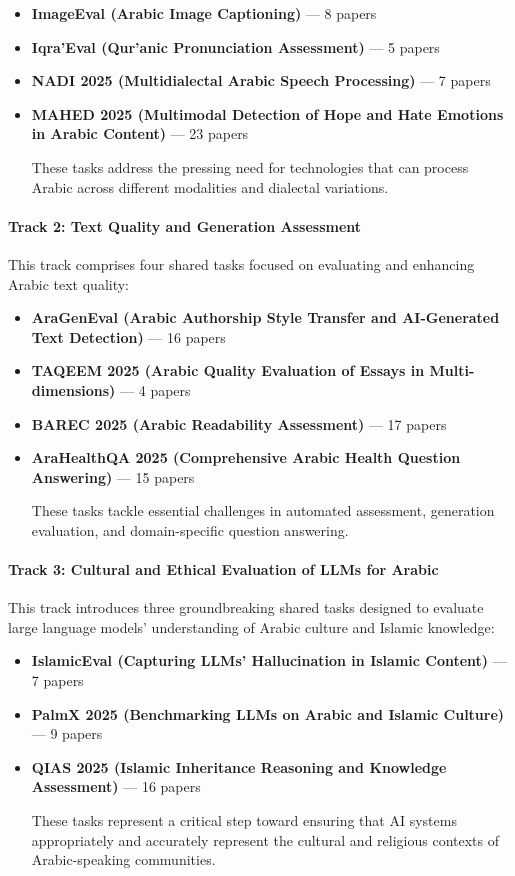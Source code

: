 \begin{itemize}
    \item \textbf{ImageEval (Arabic Image Captioning)} — 8 papers
    \item \textbf{Iqra’Eval (Qur’anic Pronunciation Assessment)} — 5 papers
    \item \textbf{NADI 2025 (Multidialectal Arabic Speech Processing)} — 7 papers
    \item \textbf{MAHED 2025 (Multimodal Detection of Hope and Hate Emotions in Arabic Content)} — 23 papers

 These tasks address the pressing need for technologies that can process Arabic across different modalities and dialectal variations.
\end{itemize}

\paragraph{\textbf{Track 2: Text Quality and Generation Assessment}}

This track comprises four shared tasks focused on evaluating and enhancing Arabic text quality:

\begin{itemize}
    \item \textbf{AraGenEval (Arabic Authorship Style Transfer and AI-Generated Text Detection)} — 16 papers
    \item \textbf{TAQEEM 2025 (Arabic Quality Evaluation of Essays in Multi-dimensions)} — 4 papers
    \item \textbf{BAREC 2025 (Arabic Readability Assessment)} — 17 papers
    \item \textbf{AraHealthQA 2025 (Comprehensive Arabic Health Question Answering)} — 15 papers

 These tasks tackle essential challenges in automated assessment, generation evaluation, and domain-specific question answering.
\end{itemize}

\paragraph{\textbf{Track 3: Cultural and Ethical Evaluation of LLMs for Arabic}}

This track introduces three groundbreaking shared tasks designed to evaluate large language models’ understanding of Arabic culture and Islamic knowledge:

\begin{itemize}
    \item \textbf{IslamicEval (Capturing LLMs’ Hallucination in Islamic Content)} — 7 papers
    \item \textbf{PalmX 2025 (Benchmarking LLMs on Arabic and Islamic Culture)} — 9 papers
    \item \textbf{QIAS 2025 (Islamic Inheritance Reasoning and Knowledge Assessment)} — 16 papers

 These tasks represent a critical step toward ensuring that AI systems appropriately and accurately represent the cultural and religious contexts of Arabic-speaking communities.
\end{itemize}

